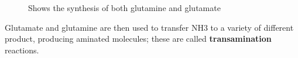 \documentclass[../main.tex]{subfiles}
\begin{document}
\begin{figure}[H]
	\centering
	\hfill
	\caption{Shows the synthesis of both glutamine and glutamate}
\end{figure}

Glutamate and glutamine are then used to transfer NH3 to a variety of different product, producing aminated molecules; these are called \textbf{\gls{transamination}} reactions. \\
\end{document}
